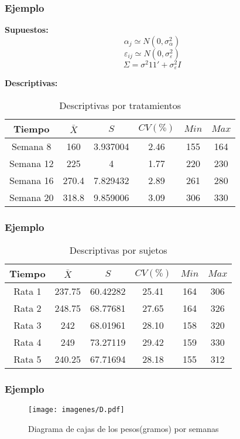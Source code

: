 \documentclass[12pt]{beamer}
\begin{document}
\begin{frame}
\frametitle{Ejemplo}
\textbf{Supuestos:} 
$$\alpha_j \simeq N(0,\sigma^2_\alpha)$$
$$\varepsilon_{ij} \simeq N(0,\sigma^2_\varepsilon)$$
$$\Sigma =\sigma^2 11' + \sigma^2_\varepsilon I$$

\textbf{Descriptivas:}
\begin{table}[htbp]
  \centering
\resizebox{12cm}{!} {
\begin{tabular}{|c|c|c|c|c|c|}
\hline 
\textbf{Tiempo} & \textbf{$\bar{X}$} & \textbf{$S$} & \textbf{$CV(\%)$} & \textbf{$Min$} & \textbf{$Max$}\\ 
\hline 
Semana 8 & 160 &3.937004& 2.46& 155 & 164\\
Semana 12 & 225 &4& 1.77& 220 & 230\\
Semana 16 & 270.4 &7.829432& 2.89& 261 & 280\\
Semana 20 & 318.8 &9.859006& 3.09& 306 & 330 \\
\hline 
\end{tabular} 
}
\caption{Descriptivas por tratamientos}
\label{tab:addlabel}%
\end{table}%
\end{frame}

\begin{frame}
\frametitle{Ejemplo}
\begin{table}[htbp]
  \centering
\resizebox{12cm}{!} {
\begin{tabular}{|c|c|c|c|c|c|}
\hline 
\textbf{Tiempo} & \textbf{$\bar{X}$} & \textbf{$S$} & \textbf{$CV(\%)$} & \textbf{$Min$} & \textbf{$Max$}\\ 
\hline 
Rata 1 & 237.75 &60.42282 & 25.41& 164 & 306\\
Rata 2 & 248.75 &68.77681 & 27.65& 164 & 326\\
Rata 3 & 242    &68.01961 & 28.10& 158 & 320\\
Rata 4 & 249    &73.27119 & 29.42& 159 & 330 \\
Rata 5 & 240.25 &67.71694 & 28.18& 155 & 312 \\
\hline 
\end{tabular} 
}
\caption{Descriptivas por sujetos}
\label{tab:addlabel}%
\end{table}%
\end{frame}

\begin{frame}
\frametitle{Ejemplo}
\begin{figure}[h!]
\caption{Diagrama de cajas de los pesos(gramos) por semanas}
  \centering
  \texttt{[image: imagenes/D.pdf]}
\end{figure}
\end{frame}
\end{document}
